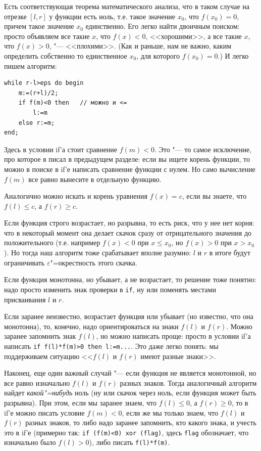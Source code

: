 \documentclass[a4paper,10pt]{problems}
\let\eps\varepsilon
\begin{document}
Есть соответствующая теорема математического анализа, что в таком случае на отрезке $[l,r]$ у функции есть ноль,
т.е. такое значение $x_0$, что $f(x_0)=0$, причем такое значение $x_0$ единственно. 
Его легко найти двоичным поиском: просто объявляем все такие $x$, что $f(x)<0$, <<хорошими>>,
а все такие $x$, что $f(x)>0$, "--- <<плохими>>. 
(Как и раньше, нам не важно, каким определить собственно то единственное $x_0$, для которого $f(x_0)=0$.)
И легко пишем алгоритм:
\begin{codesampleo}\begin{verbatim}
while r-l>eps do begin    
    m:=(r+l)/2;
    if f(m)<0 then   // можно и <=
        l:=m
    else r:=m;
end;
\end{verbatim}
\end{codesampleo}

Здесь в условии if'а стоит сравнение $f(m)<0$. 
Это "--- то самое исключение, про которое я писал в предыдущем разделе: если вы ищете корень функции, то можно в поиске в if'е написать
сравнение функции с нулем. Но само вычисление $f(m)$ все равно вынесите в отдельную функцию.

Аналогично можно искать и корень уравнения $f(x)=c$, если вы знаете, что $f(l)\leq c$, а $f(r)\geq c$.

Если функция строго возрастает, но разрывна, то есть риск, что у нее нет корня: что в некоторый момент она делает скачок сразу от отрицательного
значения до положительного (т.е. например $f(x)<0$ при $x\leq x_0$, но $f(x)>0$ при $x>x_0$). 
Но тогда наш алгоритм тоже срабатывает вполне разумно: $l$ и $r$ в итоге будут ограничивать $\eps$"=окрестность этого скачка.

Если функция монотонна, но убывает, а не возрастает, то решение тоже понятно: надо просто изменить знак проверки в \verb`if`, ну или
поменять местами присваивания $l$ и $r$. 

Если заранее неизвестно, возрастает функция или убывает (но известно, что она монотонна), то, конечно, надо ориентироваться на знаки $f(l)$ и $f(r)$.
Можно заранее запомнить знак $f(l)$, но можно написать проще: просто в условии if'а написать \verb`if f(l)*f(m)>0 then l:=m...`.
Это даже легко понять: мы поддерживаем ситуацию <<$f(l)$ и $f(r)$ имеют разные знаки>>.

Наконец, еще один важный случай "--- если функция не является монотонной, но все равно изначально $f(l)$ и $f(r)$ разных знаков. 
Тогда аналогичный алгоритм найдет \textit{какой"=нибудь} ноль (ну или скачок через ноль, если функция может быть разрывна).
При этом, если мы заранее знаем, что $f(l)\leq 0$, а $f(r)\geq 0$, то в if'е можно писать условие $f(m)<0$, 
если же мы только знаем, что $f(l)$ и $f(r)$ разных знаков, то либо надо заранее запомнить, кто какого знака, 
и учесть это в if'е (примерно так: \verb`if (f(m)<0) xor (flag)`, здесь \verb`flag` обозначает, что изначально было $f(l)>0$), 
либо писать \verb`f(l)*f(m)`.
\end{document}
